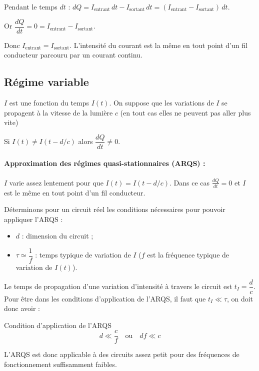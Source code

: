 \documentclass{cours}
\begin{document}
Pendant le temps $dt$ : $dQ=I_{\text{entrant}}\,dt -I_{\text{sortant}}\,dt=(I_{\text{entrant}} -I_{\text{sortant}})\,dt$.

Or $\dfrac{dQ}{dt}=0=I_{\text{entrant}} -I_{\text{sortant}}$. 

Donc $I_{\text{entrant}} =I_{\text{sortant}}$. L'intensité du courant est la même en tout point d'un fil conducteur parcouru par un courant continu.

\subsection{Régime variable}
$I$ est une fonction du temps $I(t)$. On suppose que les variations de $I$ se propagent à la vitesse de la lumière $c$ (en tout cas elles ne peuvent pas aller plus vite)

\begin{center}
\end{center}

Si $I(t)\neq I(t-d/c)$ alors $\dfrac{dQ}{dt} \neq 0$.

\paragraph{Approximation des régimes quasi-stationnaires (ARQS) : } $I$ varie assez lentement pour que $I(t)=I(t-d/c)$. Dans ce cas $\frac{dQ}{dt}=0$ et $I$ est le même en tout point d'un fil conducteur.

Déterminons pour un circuit réel les conditions nécessaires pour pouvoir appliquer l'ARQS :
\begin{itemize}
\item $d$ : dimension du circuit ;
\item $\tau \simeq \dfrac{1}{f}$ : temps typique de variation de $I$ ($f$ est la fréquence typique de variation de $I(t)$).
\end{itemize}
Le temps de propagation d'une variation d'intensité à travers le circuit est $t_I=\dfrac{d}{c}$. Pour être dans les conditions d'application de l'ARQS, il faut que $t_I \ll \tau$, on doit donc avoir :
\begin{loi}{Condition d'application de l'ARQS}
  \begin{equation}
  d\ll \frac{c}{f} \quad \text{ou} \quad df\ll c
  \end{equation}
\end{loi}
L'ARQS est donc applicable à des circuits assez petit pour des fréquences de fonctionnement suffisamment faibles.
\end{document}
